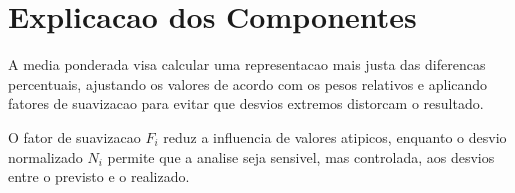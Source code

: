 \documentclass{article}
\begin{document}
\section*{Explicacao dos Componentes}

A media ponderada visa calcular uma representacao mais justa das diferencas percentuais, ajustando os valores de acordo com os pesos relativos e aplicando fatores de suavizacao para evitar que desvios extremos distorcam o resultado.

O fator de suavizacao $F_i$ reduz a influencia de valores atipicos, enquanto o desvio normalizado $N_i$ permite que a analise seja sensivel, mas controlada, aos desvios entre o previsto e o realizado.
\end{document}
